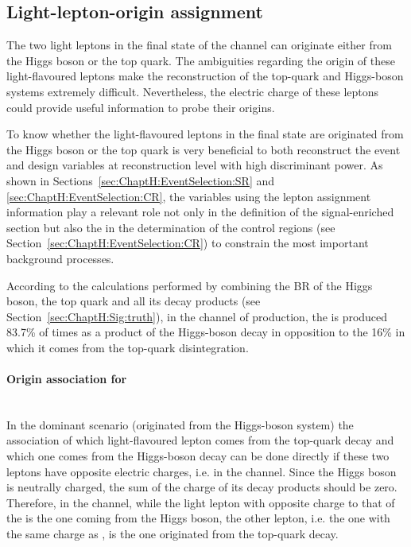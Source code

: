 

\subsection{Light-lepton-origin assignment}
\label{sec:ChaptH:Sig:LepAsign}
The two light leptons in the final state of the \dileptau channel can originate either from the 
Higgs boson or the top quark. The ambiguities regarding the origin of these light-flavoured
leptons make the reconstruction of the top-quark and Higgs-boson systems extremely difficult.
Nevertheless, the electric charge of these leptons could provide useful information to probe their origins.

To know whether the light-flavoured leptons in the final state are originated from
the Higgs boson or the top quark is very beneficial to both reconstruct the event and
design variables at reconstruction level with high discriminant power. As shown in 
Sections~\ref{sec:ChaptH:EventSelection:SR} and \ref{sec:ChaptH:EventSelection:CR},
the variables using the lepton assignment information play a relevant role not only in 
the definition of the signal-enriched section but also the in the determination of 
 the control regions (see Section~\ref{sec:ChaptH:EventSelection:CR}) to constrain the most important background processes.

According to the calculations performed by combining the BR of the Higgs boson, the top quark 
and all its decay products (see Section~\ref{sec:ChaptH:Sig:truth}),
in the \dileptau channel of \tHq production, the \tauhad is produced 83.7\% of times as a 
product of the Higgs-boson decay in opposition to the 16\% in which it comes from the top-quark
disintegration. 

\paragraph{Origin association for \dilepOStau}\mbox{}\\ %
In the dominant scenario (\tauhad originated from the Higgs-boson system) the association of which light-flavoured
lepton comes from the top-quark decay and which one comes from the Higgs-boson decay can be
done directly if these two leptons have opposite electric charges, i.e. in the \dilepOStau channel.
Since the Higgs boson is neutrally charged, the sum of the charge of its decay products should be zero. Therefore,
in the \dilepOStau channel, while the light lepton with opposite charge to that of the \tauhad is the one coming
from the Higgs boson, the other lepton, i.e. the one with the same charge as \tauhad, is the one originated 
from the top-quark decay.



